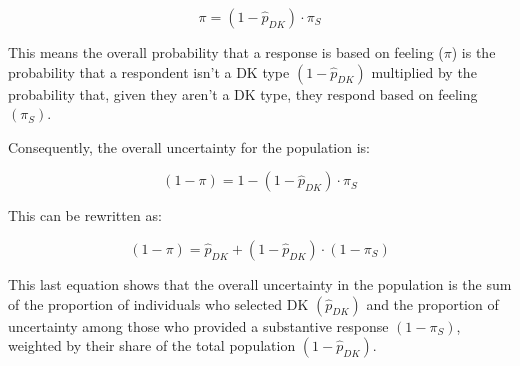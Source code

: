 \documentclass[
  letterpaper,
  DIV=11,
  numbers=noendperiod]{scrartcl}
\begin{document}
\[
\pi = (1-\hat{p}_{DK})\cdot\pi_S
\]

This means the overall probability that a response is based on feeling
(\(\pi\)) is the probability that a respondent isn't a DK type
\((1-\hat{p}_{DK})\) multiplied by the probability that, given they
aren't a DK type, they respond based on feeling \((\pi_S)\).

Consequently, the overall uncertainty for the population is:

\[
(1-\pi) = 1-(1-\hat{p}_{DK})\cdot\pi_S
\]

This can be rewritten as:

\[
(1-\pi) = \hat{p}_{DK} + (1-\hat{p}_{DK})\cdot(1-\pi_S)
\]

This last equation shows that the overall uncertainty in the population
is the sum of the proportion of individuals who selected DK
\((\hat{p}_{DK})\) and the proportion of uncertainty among those who
provided a substantive response \((1-\pi_S)\), weighted by their share
of the total population \((1-\hat{p}_{DK})\).
\end{document}
